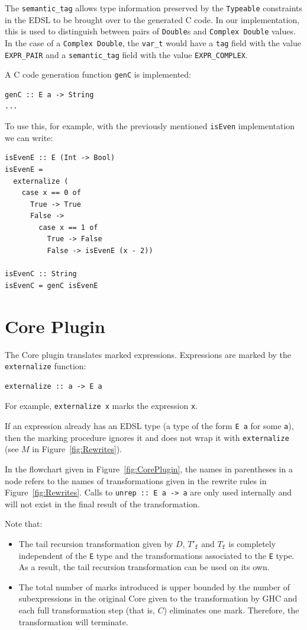 \documentclass[sigplan,anonymous,review]{acmart}
\newcommand{\ttt}{\texttt}
\begin{document}
The \ttt{semantic\_tag} allows type information preserved by the \ttt{Typeable} constraints
in the EDSL to be brought over to the generated C code. In our implementation, this is
used to distinguish between pairs of \ttt{Double}s and \ttt{Complex Double} values. In the
case of a \ttt{Complex Double}, the \ttt{var\_t} would have a \ttt{tag} field with the value
\ttt{EXPR\_PAIR} and a \ttt{semantic\_tag} field with the value \ttt{EXPR\_COMPLEX}.

A C code generation function \ttt{genC} is implemented:

\begin{lstlisting}
genC :: E a -> String
...
\end{lstlisting}

To use this, for example, with the previously mentioned \ttt{isEven} implementation we
can write:
\newpage
\begin{lstlisting}
isEvenE :: E (Int -> Bool)
isEvenE =
  externalize (
    case x == 0 of
      True -> True
      False ->
        case x == 1 of
          True -> False
          False -> isEvenE (x - 2))

isEvenC :: String
isEvenC = genC isEvenE
\end{lstlisting}

\section{Core Plugin}
\label{sec:CorePlugin}

The Core plugin translates marked expressions. Expressions are marked by
the \ttt{externalize} function:

\begin{lstlisting}
externalize :: a -> E a
\end{lstlisting}

For example, \ttt{externalize x} marks the expression \ttt{x}.

If an expression already has an EDSL type (a type of the form \ttt{E a} for some
\ttt{a}), then the marking procedure ignores it and does not wrap it with
\ttt{externalize} (see $M$ in Figure~\ref{fig:Rewrites}).

In the flowchart given in Figure~\ref{fig:CorePlugin}, the names in parentheses in a node refers
to the names of transformations given in the rewrite rules in Figure~\ref{fig:Rewrites}. Calls
to \ttt{unrep :: E a -> a} are only used internally and will not exist in
the final result of the transformation.

Note that:
\begin{itemize}
  \item The tail recursion transformation given by $D$, $T'_{\ttt{f}}$ and $T_{\ttt{f}}$ is completely independent of the \ttt{E} type and the transformations associated to the \ttt{E} type. As a result, the tail recursion transformation can be used on its own.

  \item The total number of marks introduced is upper bounded by the number of
subexpressions in the original Core given to the transformation by GHC and each
full transformation step (that is, $C$) eliminates one mark. Therefore, the
transformation will terminate.
\end{itemize}
\end{document}
